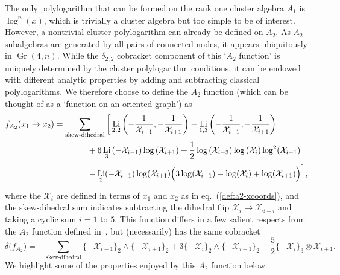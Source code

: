 \documentclass[11pt]{article}
\DeclareMathOperator{\Gr}{Gr}
\DeclareMathOperator{\Li}{Li}
\def\x{\mathcal{X}}
\begin{document}
The only polylogarithm that can be formed on the rank one cluster algebra $A_1$ is $\log^n(x)$, which is trivially a cluster algebra but too simple to be of interest. However, a nontrivial cluster polylogarithm can already be defined on $A_2$. As $A_2$ subalgebras are generated by all pairs of connected nodes, it appears ubiquitously in $\Gr(4,n)$. While the $\delta_{2,2}$ cobracket component of this `$A_2$ function' is uniquely determined by the cluster polylogarithm conditions, it can be endowed with different analytic properties by adding and subtracting classical polylogarithms. We therefore choose to define the $A_2$ function (which can be thought of as a `function on an oriented graph') as
\begin{align}\label{def:a2-function}
	f_{A_2}(x_1 \to x_2)  &= \sum_{\text{skew-dihedral}} \bigg[ \Li_{2,2}\left(-\frac{1}{\x_{i-1}},-\frac{1}{\x_{i+1}}\right) - \Li_{1,3}\left(-\frac{1}{\x_{i-1}},-\frac{1}{\x_{i+1}}\right) \nonumber \\
	&\hspace{1.4cm} +6 \Li_3\left(-\x_{i-1}\right) \log \left(\x_{i+1}\right) +\frac{1}{2} \log \left(\x_{i-3}\right) \log \left(\x_i\right) \log^2\! \left(\x_{i-1}\right) {\color{white} \bigg|}\\
	&\hspace{1.4cm} -\Li_2(-\x_{i-1}) \log (\x_{i+1}) \Big(3 \log (\x_{i-1})-\log (\x_i)+\log (\x_{i+1})\Big) \bigg], \nonumber
\end{align}
where the $\x_i$ are defined in terms of $x_1$ and $x_2$ as in eq.~(\ref{def:a2-xcoords}), and the skew-dihedral sum indicates subtracting the dihedral flip $\x_i \to \x_{6-i}$ and taking a cyclic sum $i=1$ to $5$. This function differs in a few salient respects from the $A_2$ function defined in~\cite{Golden:2014xqa}, but (necessarily) has the same cobracket
\begin{equation} \label{eq:A2_cobracket}
	\delta\big(f_{A_2}\big) = -\sum_{\text{skew-dihedral}} \{-\x_{i-1}\}_2 \wedge \{-\x_{i+1}\}_2 + 3\{-\x_{i}\}_2 \wedge \{-\x_{i+1}\}_2 + \frac{5}{2}\{-\x_{i}\}_3 \otimes \x_{i+1}.
\end{equation}
We highlight some of the properties enjoyed by this $A_2$ function below.
\end{document}
